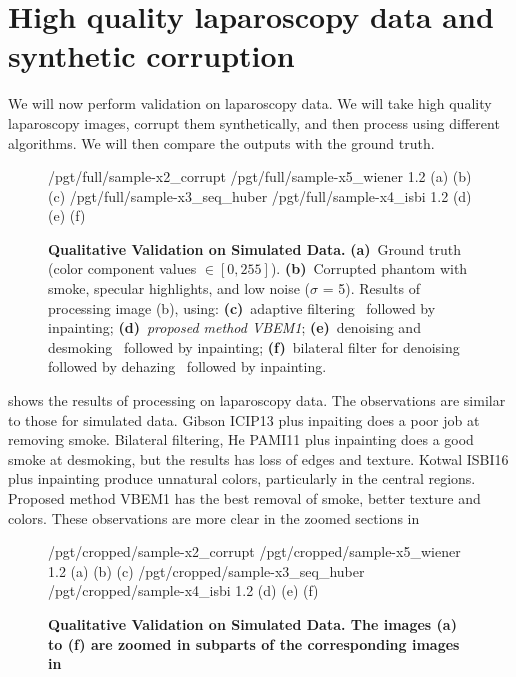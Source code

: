 \section{High quality laparoscopy data and synthetic corruption}
We will now perform validation on laparoscopy data. We will take high quality laparoscopy images, corrupt them synthetically, and then process using different algorithms. We will then compare the outputs with the ground truth.

\begin{figure}[!h]
     {/pgt/full/sample-x2_corrupt} {/pgt/full/sample-x5_wiener} {1.2} {(a)} {(b)} {(c)}
     {/pgt/full/sample-x3_seq_huber} {/pgt/full/sample-x4_isbi} {1.2} {(d)} {(e)} {(f)}
    \vspace{-10pt}
    \caption
    {
        {\bf Qualitative Validation on Simulated Data. }
        {\bf (a)}~Ground truth (color component values $\in [0,255]$).
        {\bf (b)}~Corrupted phantom with smoke, specular highlights, and low noise ($\sigma$ = 5).
        Results of processing image (b), using:
        {\bf (c)}~adaptive filtering~\cite{gibson2013wiener} followed by inpainting;
        {\bf (d)}~{\em proposed method VBEM1};
        {\bf (e)}~denoising and desmoking~\cite{kotwal2016joint} followed by inpainting;
        {\bf (f)}~bilateral filter for denoising followed by dehazing~\cite{he2011dark} followed by inpainting.
    }
    \label{fig:pgtImagesFull}
\end{figure}
 shows the results of processing on laparoscopy data. The observations are similar to those for simulated data. Gibson ICIP13 \cite{gibson2013wiener} plus inpaiting does a poor job at removing smoke. Bilateral filtering, He PAMI11 \cite{he2011dark} plus inpainting does a good smoke at desmoking, but the results has loss of edges and texture. Kotwal ISBI16 plus inpainting produce unnatural colors, particularly in the central regions. Proposed method VBEM1 has the best removal of smoke, better texture and colors. These observations are more clear in the zoomed sections in 

\begin{figure}[!h]
     {/pgt/cropped/sample-x2_corrupt} {/pgt/cropped/sample-x5_wiener} {1.2} {(a)} {(b)} {(c)}
     {/pgt/cropped/sample-x3_seq_huber} {/pgt/cropped/sample-x4_isbi} {1.2} {(d)} {(e)} {(f)}
    \vspace{-10pt}
    \caption
    {
        {\bf Qualitative Validation on Simulated Data. The images (a) to (f) are zoomed in subparts of the corresponding images in }
    }
    \label{fig:pgtImagesCropped}
\end{figure}

